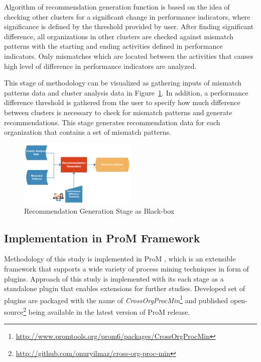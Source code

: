 Algorithm of recommendation generation function is based on the idea of checking other clusters for a significant change in performance indicators, where significance is defined by the threshold provided by user. After finding significant difference, all organizations in other clusters are checked against mismatch patterns with the starting and ending activities defined in performance indicators. Only mismatches which are located between the activities that causes high level of difference in performance indicators are analyzed. 

This stage of methodology can be visualized as gathering inputs of mismatch patterns data and cluster analysis data in Figure~\ref{fig:recommendation-generation-blackox}. In addition, a performance difference threshold is gathered from the user to specify how much difference between clusters is necessary to check for mismatch patterns and generate recommendations. This stage generates recommendation data for each organization that contains a set of mismatch patterns.
\begin{figure}
  \centering
  \includegraphics[width=0.5\textwidth]{4_methodology/recommendation-generation-blackbox}
  \caption{Recommendation Generation Stage as Black-box}
  \label{fig:recommendation-generation-blackox}
\end{figure}

\subsection{Implementation in ProM Framework}
\label{subsec:implementation}
Methodology of this study is implemented in ProM \cite{verbeek2010prom}, which is an extensible framework that supports a wide variety of process mining techniques in form of plugins. Approach of this study is implemented with its each stage as a standalone plugin that enables extensions for further studies. Developed set of plugins are packaged with the name of \textit{CrossOrgProcMin}\footnote{\url{http://www.promtools.org/prom6/packages/CrossOrgProcMin}} and published open-source\footnote{\url{http://github.com/onuryilmaz/cross-org-proc-min}} being available in the latest version of ProM release.